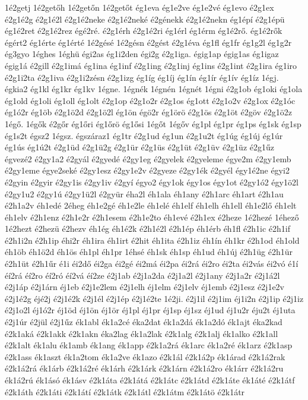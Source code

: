 {1é2getj
1é2getőh
1é2getőn
1é2getőt
ég1eva
ég1e2ve
ég1e2vé
ég1evo
é2g1ex
é2g1é2g
é2g1é2l
é2g1é2neke
é2g1é2neké
é2génekk
é2g1é2nekn
ég1épí
é2g1épü
ég1é2ret
é2g1é2rez
égé2ré.
é2g1érh
é2g1é2ri
ég1érl
ég1érm
ég1é2rő.
ég1é2rők
égért2
ég1érte
ég1érté
1é2gésé
1é2gésn
é2gést
é2g1éva
ég1fl
ég1fr
ég1g2l
ég1g2r
ég3gyo
1éghes
1éghü
égi2as
ég1i2den
égi2g
é2g1iga.
égig1ap
égig1as
ég1igaz
égig1á
é2gill
é2g1imá
ég1ina
ég1inf
é2g1ing
é2g1inj
ég1ins
é2g1int
é2g1ira
ég1iro
é2g1i2ta
é2g1iva
é2g1i2zésn
é2g1izg
ég1íg
ég1íj
ég1ín
ég1ír
ég1ív
ég1íz
1égj.
égkia2
ég1kl
ég1kr
ég1kv
1égne.
1égnék
1égnén
1égnét
1égni
é2g1ob
ég1oki
ég1ola
ég1old
ég1oli
ég1oll
ég1olt
é2g1op
é2g1o2r
é2g1os
ég1ott
é2g1o2v
é2g1ox
é2g1óc
ég1ó2r
ég1öb
é2g1ö2d
é2g1ö2l
ég1ön
égö2r
ég1örö
é2g1ös
é2g1öt
é2göv
é2g1ö2z
1égő.
1égők
é2gőr
ég1őri
ég1őrö
ég1ősi
1égőt
1égőv
ég1pl
ég1pr
ég1ps
ég1sk
ég1sp
ég1s2t
égsz2
1égsz.
égszáraz1
ég1tr
é2g1ud
ég1un
é2g1u2t
ég1úg
ég1új
ég1úr
ég1ús
ég1ú2t
é2g1üd
é2g1ü2g
é2g1ür
é2g1üs
é2g1üt
é2g1üv
é2g1üz
é2g1űz
égvezé2
é2gy1a2
é2gyál
é2gyedé
é2gy1eg
é2gyelek
é2gyeleme
égye2m
é2gy1emb
é2gy1eme
égye2seké
é2gy1esz
é2gy1e2v
é2gyeze
é2gy1ék
é2gyél
égy1é2ne
égyi2
é2gyin
é2gyir
é2gy1is
é2gy1iv
é2gyí
égyo2
égy1ok
égy1os
égy1ot
é2gy1ó2
égy1ö2l
é2gy1u2
é2gy1ú
é2gy1ü2l
é2gyür
éha2l
éh1ala
éh1any
é2h1arc
éh1art
é2h1au
é2h1a2v
éh1edé
2éheg
éh1e2gé
éh1e2le
éh1elé
éh1elf
éh1elh
éh1ell
éh1e2lő
éh1elt
éh1elv
é2h1enz
é2h1e2r
é2h1esem
é2h1e2to
éh1evé
é2h1ex
é2heze
1é2hezé
1éhező
1é2hezt
é2hezü
é2hezv
éh1ég
éh1é2k
é2h1é2l
é2h1ép
éh1érb
éh1fl
é2h1ic
é2h1if
é2h1i2n
é2h1ip
éhi2r
éh1ira
éh1irt
é2hit
éh1ita
é2h1iz
éh1ín
éh1kr
é2h1od
éh1old
éh1öb
éh1ö2d
éh1ös
éh1pl
éh1pr
1éhsé
éh1sk
éh1sp
éh1ud
éh1új
é2h1üg
é2h1ür
é2h1üt
é2h1űr
é1i
éi2dő
éi2ga
éi2gé
éi2má
éi2pa
éi2rá
éi2ro
éi2ta
éi2vás
éi2vó
é1í
éí2rá
éí2ro
éí2ró
éí2vá
éí2ze
é2j1ab
é2j1a2da
é2j1a2l
é2j1any
é2j1a2r
é2j1á2l
é2j1áp
é2j1árn
éj1eb
é2j1e2lem
é2j1elh
éj1elm
é2j1elv
éj1emb
é2j1esz
é2j1e2v
é2j1é2g
éjé2j
é2j1é2k
é2j1él
é2j1ép
é2j1é2te
1é2ji.
é2j1il
é2j1im
éj1i2n
é2j1ip
é2j1iz
é2j1o2l
éj1ó2r
éj1öd
éj1ön
éj1ör
éj1pl
éj1pr
éj1sp
éj1sz
éj1ud
éj1u2r
éju2t
éj1uta
é2j1úr
é2jül
é2j1űz
ék1abl
ék1a2cé
éka2dat
ék1a2dá
ék1a2dó
ék1ajt
éka2kad
é2k1aká
é2k1akk
é2k1akn
éka2lag
ék1a2lak
é2k1alg
é2k1alj
ék1alko
é2k1all
é2k1alt
ék1alu
ék1amb
ék1ang
ék1app
é2k1a2rá
ék1arc
ék1a2ré
ék1arz
é2k1asp
é2k1ass
ék1aszt
ék1a2tom
ék1a2ve
ék1azo
é2k1ál
é2k1á2p
ék1árad
é2k1á2rak
é2k1á2rá
ék1árb
é2k1á2ré
ék1árh
é2k1árk
é2k1árn
é2k1á2ro
ék1árr
é2k1á2ru
ék1á2rú
ék1ásó
ék1ásv
é2k1áta
é2k1átá
é2k1átc
é2k1átd
é2k1áte
ék1áté
é2k1átf
é2k1áth
é2k1áti
é2k1átí
é2k1átk
é2k1átl
é2k1átm
é2k1átö
é2k1átr
}
